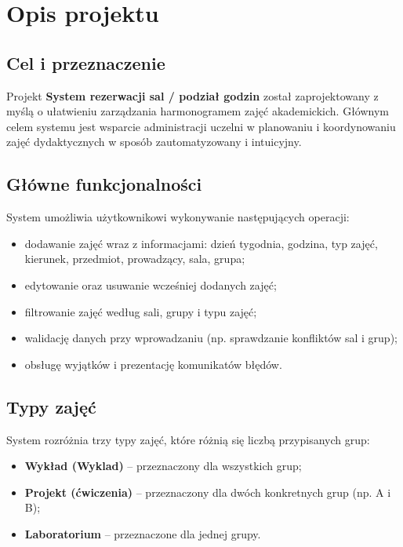 \section{Opis projektu}

\subsection{Cel i przeznaczenie}

Projekt \textbf{System rezerwacji sal / podział godzin} został zaprojektowany z myślą o ułatwieniu zarządzania harmonogramem zajęć akademickich.  
Głównym celem systemu jest wsparcie administracji uczelni w planowaniu i koordynowaniu zajęć dydaktycznych w sposób zautomatyzowany i intuicyjny.

\subsection{Główne funkcjonalności}

System umożliwia użytkownikowi wykonywanie następujących operacji:

\begin{itemize}
    \item dodawanie zajęć wraz z informacjami: dzień tygodnia, godzina, typ zajęć, kierunek, przedmiot, prowadzący, sala, grupa;
    \item edytowanie oraz usuwanie wcześniej dodanych zajęć;
    \item filtrowanie zajęć według sali, grupy i typu zajęć;
    \item walidację danych przy wprowadzaniu (np. sprawdzanie konfliktów sal i grup);
    \item obsługę wyjątków i prezentację komunikatów błędów.
\end{itemize}

\subsection{Typy zajęć}

System rozróżnia trzy typy zajęć, które różnią się liczbą przypisanych grup:

\begin{itemize}
    \item \textbf{Wykład (Wyklad)} – przeznaczony dla wszystkich grup;
    \item \textbf{Projekt (ćwiczenia)} – przeznaczony dla dwóch konkretnych grup (np. A i B);
    \item \textbf{Laboratorium} – przeznaczone dla jednej grupy.
\end{itemize}

